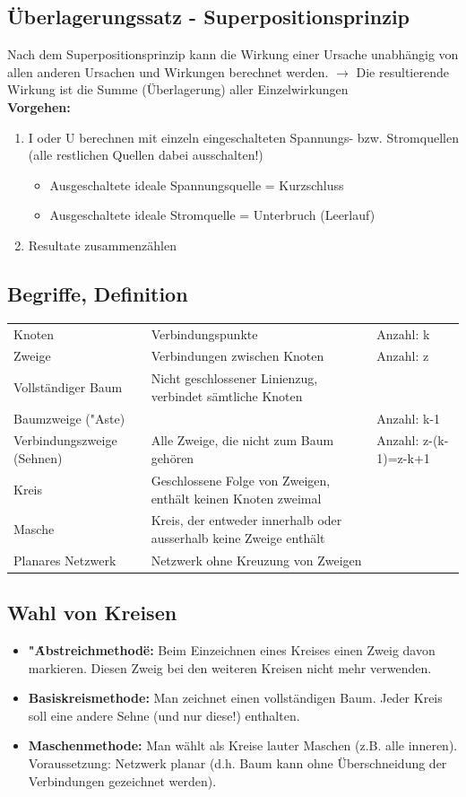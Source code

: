 \subsection{Überlagerungssatz - Superpositionsprinzip}
Nach dem Superpositionsprinzip kann die Wirkung einer Ursache unabhängig von allen anderen Ursachen und Wirkungen berechnet werden. $\rightarrow$ Die resultierende Wirkung ist die Summe (Überlagerung) aller Einzelwirkungen \\
\textbf{Vorgehen:} 
\begin{enumerate}
	\item I oder U berechnen mit einzeln eingeschalteten Spannungs- bzw. Stromquellen (alle restlichen Quellen dabei ausschalten!)
	\begin{itemize}
		\item Ausgeschaltete ideale Spannungsquelle = Kurzschluss
		\item Ausgeschaltete ideale Stromquelle = Unterbruch (Leerlauf)
	\end{itemize}
	\item Resultate zusammenzählen
\end{enumerate}
\subsection{Begriffe, Definition}
\begin{tabular}{lll}
Knoten & Verbindungspunkte & Anzahl: k \\
Zweige & Verbindungen zwischen Knoten & Anzahl: z \\
Vollständiger Baum & Nicht geschlossener Linienzug, verbindet sämtliche Knoten& \\
Baumzweige ("Aste) & &  Anzahl: k-1\\
Verbindungszweige (Sehnen) & Alle Zweige, die nicht zum Baum gehören & Anzahl: z-(k-1)=z-k+1\\
Kreis & Geschlossene Folge von Zweigen, enthält keinen Knoten zweimal & \\
Masche & Kreis, der entweder innerhalb oder ausserhalb keine Zweige enthält & \\
Planares Netzwerk & Netzwerk ohne Kreuzung von Zweigen & \\
\end{tabular}

\subsection{Wahl von Kreisen}
\begin{itemize}
\item \textbf{"\.Abstreichmethode\" \;:} Beim Einzeichnen eines Kreises einen Zweig davon markieren. Diesen Zweig bei den weiteren Kreisen nicht mehr verwenden.
\item \textbf{Basiskreismethode:} Man zeichnet einen vollständigen Baum. Jeder Kreis soll eine andere Sehne (und nur diese!) enthalten.
\item \textbf{Maschenmethode:} Man wählt als Kreise lauter Maschen (z.B. alle inneren). Voraussetzung: Netzwerk planar (d.h. Baum kann ohne Überschneidung der Verbindungen gezeichnet werden).
\end{itemize}

